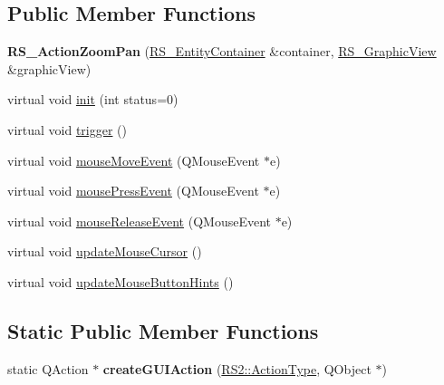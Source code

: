 \subsection*{Public Member Functions}
\begin{DoxyCompactItemize}
\item 
\hypertarget{classRS__ActionZoomPan_a9e1369935db2a7b7b84efbddf7f79843}{{\bfseries R\-S\-\_\-\-Action\-Zoom\-Pan} (\hyperlink{classRS__EntityContainer}{R\-S\-\_\-\-Entity\-Container} \&container, \hyperlink{classRS__GraphicView}{R\-S\-\_\-\-Graphic\-View} \&graphic\-View)}\label{classRS__ActionZoomPan_a9e1369935db2a7b7b84efbddf7f79843}

\item 
virtual void \hyperlink{classRS__ActionZoomPan_a38dc761f0b0ee856c1a226622260ac35}{init} (int status=0)
\item 
virtual void \hyperlink{classRS__ActionZoomPan_ace3accd012895715d996d9e335136bf7}{trigger} ()
\item 
virtual void \hyperlink{classRS__ActionZoomPan_a52f3b336ed53c846cc0b4b8b1551c0bc}{mouse\-Move\-Event} (Q\-Mouse\-Event $\ast$e)
\item 
virtual void \hyperlink{classRS__ActionZoomPan_a0bdd82a7b5b910ab6d191cde3219fe4e}{mouse\-Press\-Event} (Q\-Mouse\-Event $\ast$e)
\item 
virtual void \hyperlink{classRS__ActionZoomPan_afd109f35124a1efe5e59d214b46143e8}{mouse\-Release\-Event} (Q\-Mouse\-Event $\ast$e)
\item 
virtual void \hyperlink{classRS__ActionZoomPan_aa16882287c5c174e1bde79db02d76da1}{update\-Mouse\-Cursor} ()
\item 
virtual void \hyperlink{classRS__ActionZoomPan_a4201709503a25f5472280c1be3952311}{update\-Mouse\-Button\-Hints} ()
\end{DoxyCompactItemize}
\subsection*{Static Public Member Functions}
\begin{DoxyCompactItemize}
\item 
\hypertarget{classRS__ActionZoomPan_a37bdea64d696e5f95fb7e25ea6f4ffa3}{static Q\-Action $\ast$ {\bfseries create\-G\-U\-I\-Action} (\hyperlink{classRS2_afe3523e0bc41fd637b892321cfc4b9d7}{R\-S2\-::\-Action\-Type}, Q\-Object $\ast$)}\label{classRS__ActionZoomPan_a37bdea64d696e5f95fb7e25ea6f4ffa3}

\end{DoxyCompactItemize}
